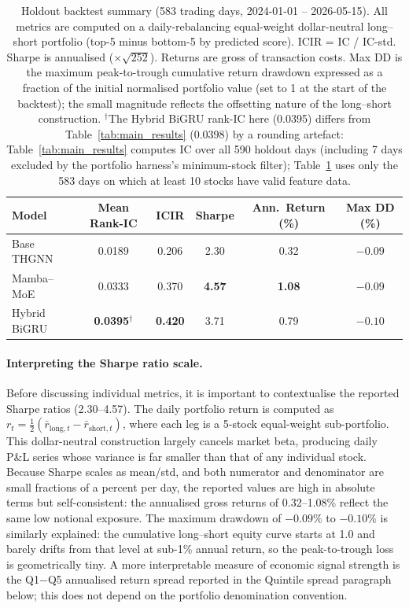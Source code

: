 \documentclass[a4paper,11pt]{report}
\begin{document}
\begin{table}[htbp]
\centering
\caption{Holdout backtest summary (583 trading days, 2024-01-01 -- 2026-05-15). All metrics are computed on a daily-rebalancing equal-weight dollar-neutral long--short portfolio (top-5 minus bottom-5 by predicted score). ICIR = IC / IC-std. Sharpe is annualised ($\times\sqrt{252}$). Returns are gross of transaction costs. Max DD is the maximum peak-to-trough cumulative return drawdown expressed as a fraction of the initial normalised portfolio value (set to 1 at the start of the backtest); the small magnitude reflects the offsetting nature of the long--short construction. $^{\dagger}$The Hybrid BiGRU rank-IC here (0.0395) differs from Table~\ref{tab:main_results} (0.0398) by a rounding artefact: Table~\ref{tab:main_results} computes IC over all 590 holdout days (including 7 days excluded by the portfolio harness's minimum-stock filter); Table~\ref{tab:backtest_summary} uses only the 583 days on which at least 10 stocks have valid feature data.}
\label{tab:backtest_summary}
\begin{tabular}{lccccc}
\toprule
\textbf{Model} & \textbf{Mean Rank-IC} & \textbf{ICIR} & \textbf{Sharpe} & \textbf{Ann.\ Return (\%)} & \textbf{Max DD (\%)} \\
\midrule
Base THGNN   & 0.0189 & 0.206 & 2.30           & 0.32           & $-0.09$ \\
Mamba--MoE   & 0.0333 & 0.370 & \textbf{4.57}  & \textbf{1.08}  & $-0.09$ \\
Hybrid BiGRU & \textbf{0.0395}$^{\dagger}$ & \textbf{0.420} & 3.71 & 0.79 & $-0.10$ \\
\bottomrule
\end{tabular}
\end{table}

\paragraph{Interpreting the Sharpe ratio scale.}
Before discussing individual metrics, it is important to contextualise the reported Sharpe ratios (2.30--4.57). The daily portfolio return is computed as $r_t = \tfrac{1}{2}(\bar{r}_{\text{long},t} - \bar{r}_{\text{short},t})$, where each leg is a 5-stock equal-weight sub-portfolio. This dollar-neutral construction largely cancels market beta, producing daily P\&L series whose variance is far smaller than that of any individual stock. Because Sharpe scales as mean/std, and both numerator and denominator are small fractions of a percent per day, the reported values are high in absolute terms but self-consistent: the annualised gross returns of 0.32--1.08\% reflect the same low notional exposure. The maximum drawdown of $-0.09\%$ to $-0.10\%$ is similarly explained: the cumulative long--short equity curve starts at 1.0 and barely drifts from that level at sub-1\% annual return, so the peak-to-trough loss is geometrically tiny. A more interpretable measure of economic signal strength is the Q1$-$Q5 annualised return spread reported in the Quintile spread paragraph below; this does not depend on the portfolio denomination convention.
\end{document}
